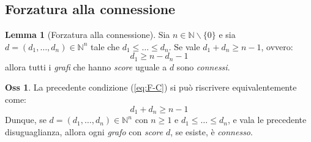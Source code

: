 \documentclass[12pt, a4paper]{report}
\newcommand{\N}{\mathbb{N}}
\theoremstyle{definition}
\newtheorem{lemma}{Lemma}[section]
\newtheorem{observation}{Oss}[section]
\begin{document}
\subsection{Forzatura alla connessione}
\begin{lemma}[Forzatura alla connessione]
    Sia $n\in\N\backslash\{0\}$ e sia $d=(d_1,\dots,d_n)\in\N^n$ tale che $d_1\leq
    \dots\leq d_n$. Se vale $d_1+d_n\geq n-1$, ovvero:
    \begin{equation}\label{eq:F-C}\tag{F-C}
        d_1\geq n-d_n-1
    \end{equation}
    allora tutti i \emph{grafi} che hanno \emph{score} uguale a $d$ sono
    \emph{connessi}.
\end{lemma}
\begin{observation}
    La precedente condizione (\ref{eq:F-C}) si può riscrivere equivalentemente come:
    \begin{equation}\label{eq:F-C2}\tag{F-C}
        d_1+d_n\geq n-1
    \end{equation}
    Dunque, se $d=(d_1,\dots,d_n)\in\N^n$ con $n\geq 1$ e $d_1\leq\dots\leq d_n$,
    e vala le precedente disuguaglianza, allora ogni \emph{grafo} con \emph{score}
    $d$, se esiste, è \emph{connesso}.
\end{observation}
\end{document}
